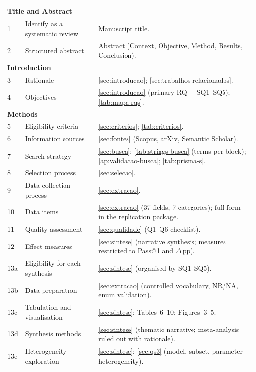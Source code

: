 \begin{longtable}{p{0.5cm}p{4.5cm}p{8.5cm}}
\multicolumn{3}{l}{\textbf{Title and Abstract}} \\
\midrule
1  & Identify as a systematic review
   & Manuscript title. \\
2  & Structured abstract
   & Abstract (Context, Objective, Method, Results, Conclusion). \\
\midrule
\multicolumn{3}{l}{\textbf{Introduction}} \\
\midrule
3  & Rationale
   & \autoref{sec:introducao}; \autoref{sec:trabalhos-relacionados}. \\
4  & Objectives
   & \autoref{sec:introducao} (primary RQ + SQ1--SQ5); \autoref{tab:mapa-rqs}. \\
\midrule
\multicolumn{3}{l}{\textbf{Methods}} \\
\midrule
5  & Eligibility criteria
   & \autoref{sec:criterios}; \autoref{tab:criterios}. \\
6  & Information sources
   & \autoref{sec:fontes} (Scopus, arXiv, Semantic Scholar). \\
7  & Search strategy
   & \autoref{sec:busca}; \autoref{tab:strings-busca} (terms per block);
     \autoref{ap:validacao-busca}; \autoref{tab:prisma-s}. \\
8  & Selection process
   & \autoref{sec:selecao}. \\
9  & Data collection process
   & \autoref{sec:extracao}. \\
10 & Data items
   & \autoref{sec:extracao} (37 fields, 7 categories); full form in the replication
     package. \\
11 & Quality assessment
   & \autoref{sec:qualidade} (Q1--Q6 checklist). \\
12 & Effect measures
   & \autoref{sec:sintese} (narrative synthesis; measures restricted to Pass@1 and
     $\Delta$\,pp). \\
13a & Eligibility for each synthesis
    & \autoref{sec:sintese} (organised by SQ1--SQ5). \\
13b & Data preparation
    & \autoref{sec:extracao} (controlled vocabulary, NR/NA, enum validation). \\
13c & Tabulation and visualisation
    & \autoref{sec:sintese}; Tables~6--10; Figures~3--5. \\
13d & Synthesis methods
    & \autoref{sec:sintese} (thematic narrative; meta-analysis ruled out with rationale). \\
13e & Heterogeneity exploration
    & \autoref{sec:sintese}; \autoref{sec:qs3} (model, subset, parameter
      heterogeneity). \\

\end{longtable}
